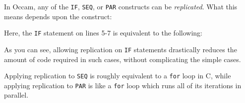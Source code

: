In Occam, any of the \texttt{IF}, \texttt{SEQ}, or \texttt{PAR} constructs can
be \textit{replicated}. What this means depends upon the construct:

Here, the \texttt{IF} statement on lines 5-7 is equivalent to the following:

As you can see, allowing replication on \texttt{IF} statements drastically
reduces the amount of code required in such cases, without complicating the
simple cases.

Applying replication to \texttt{SEQ} is roughly equivalent to a \texttt{for}
loop in C, while applying replication to \texttt{PAR} is like a \texttt{for}
loop which runs all of its iterations in parallel.
